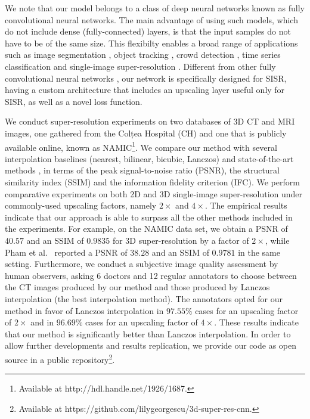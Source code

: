 \documentclass{ieeeaccess}
\begin{document}
We note that our model belongs to a class of deep neural networks known as fully convolutional neural networks. The main advantage of using such models, which do not include dense (fully-connected) layers, is that the input samples do not have to be of the same size. This flexibilty enables a broad range of applications such as image segmentation \cite{Long-CVPR-2015}, object tracking \cite{Wang-ICCV-2015}, crowd detection \cite{Castellano-SOFSEM-2020}, time series classification \cite{Karim-Access-2017} and single-image super-resolution \cite{Du-AS-2019, Hatvani-TRPMS-2018, Yu-ICIP-2017, Zhao-TMI-2019}. Different from other fully convolutional neural networks \cite{Du-AS-2019, Hatvani-TRPMS-2018, Yu-ICIP-2017, Zhao-TMI-2019,Long-CVPR-2015,Wang-ICCV-2015,Castellano-SOFSEM-2020,Karim-Access-2017}, our network is specifically designed for SISR, having a custom architecture that includes an upscaling layer \cite{Shi-CVPR-2016} useful only for SISR, as well as a novel loss function.

We conduct super-resolution experiments on two databases of 3D CT and MRI images, one gathered from the Colțea Hospital (CH) and one that is publicly available online, known as NAMIC\footnote{Available at {http://hdl.handle.net/1926/1687}.}. We compare our method with several interpolation baselines (nearest, bilinear, bicubic, Lanczos) and state-of-the-art methods \cite{Du-AS-2019, Pham-CMIG-2019, You-TMI-2019, ZENG-CBM-2018}, in terms of the peak signal-to-noise ratio (PSNR), the structural similarity index (SSIM) and the information fidelity criterion (IFC). We perform comparative experiments on both 2D and 3D single-image super-resolution under commonly-used upscaling factors, namely $2\times$ and $4\times$. The empirical results indicate that our approach is able to surpass all the other methods included in the experiments. For example, on the NAMIC data set, we obtain a PSNR of $40.57$ and an SSIM of $0.9835$ for 3D super-resolution by a factor of $2\times$, while Pham et al.~\cite{Pham-CMIG-2019} reported a PSNR of $38.28$ and an SSIM of $0.9781$ in the same setting. Furthermore, we conduct a subjective image quality assessment by human observers, asking 6 doctors and 12 regular annotators to choose between the CT images produced by our method and those produced by Lanczos interpolation (the best interpolation method). The annotators opted for our method in favor of Lanczos interpolation in $97.55\%$ cases for an upscaling factor of $2\times$ and in $96.69\%$ cases for an upscaling factor of $4\times$. These results indicate that our method is significantly better than Lanczos interpolation. In order to allow further developments and results replication, we provide our code as open source in a public repository\footnote{Available at {https://github.com/lilygeorgescu/3d-super-res-cnn}.}.
\end{document}
